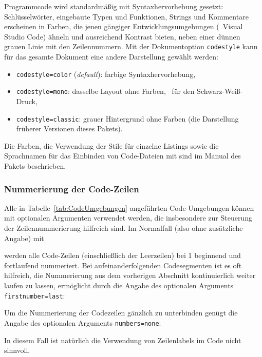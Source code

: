 Programmcode wird standardmäßig mit Syntaxhervorhebung gesetzt:
Schlüsselwörter, eingebaute Typen und Funktionen, Strings und Kommentare
erscheinen in Farben, die jenen gängiger Entwicklungsumgebungen (\zB\ Visual
Studio Code) ähneln und ausreichend Kontrast bieten, neben einer dünnen grauen
Linie mit den Zeilennummern. Mit der Dokumentoption \texttt{codestyle} kann für
das gesamte Dokument eine andere Darstellung gewählt werden:
%
\begin{itemize}
	\item[] \texttt{codestyle=color} (\emph{default}): farbige Syntaxhervorhebung,
	\item[] \texttt{codestyle=mono}: dasselbe Layout ohne Farben, \zB\ für den
		Schwarz-Weiß-Druck,
	\item[] \texttt{codestyle=classic}: grauer Hintergrund ohne Farben (die
		Darstellung früherer Versionen dieses Pakets).
\end{itemize}
%
Die Farben, die Verwendung der Stile für einzelne Listings sowie die
Sprachnamen für das Einbinden von Code-Dateien mit \verb!!
sind im Manual des Pakets beschrieben.


\subsubsection{Nummerierung der Code-Zeilen}

Alle in Tabelle~\ref{tab:CodeUmgebungen} angeführten Code-Umgebungen können
mit optionalen Argumenten verwendet werden, die insbesondere zur Steuerung
der Zeilennummerierung hilfreich sind. Im Normalfall (also ohne zusätzliche
Angabe) mit
%
%
werden alle Code-Zeilen (einschließlich der Leerzeilen) bei 1 beginnend und
fortlaufend nummeriert. Bei aufeinanderfolgenden Codesegmenten ist es oft
hilfreich, die Nummerierung aus dem vorherigen Abschnitt kontinuierlich
weiter laufen zu lassen, ermöglicht durch die Angabe des optionalen Arguments
\texttt{firstnumber={\obnh}last}:
%
%
Um die Nummerierung der Codezeilen gänzlich zu unterbinden genügt die Angabe
des optionalen Arguments \texttt{numbers={\obnh}none}:
%
%
In diesem Fall ist natürlich die Verwendung von Zeilenlabels im Code nicht
sinnvoll.


